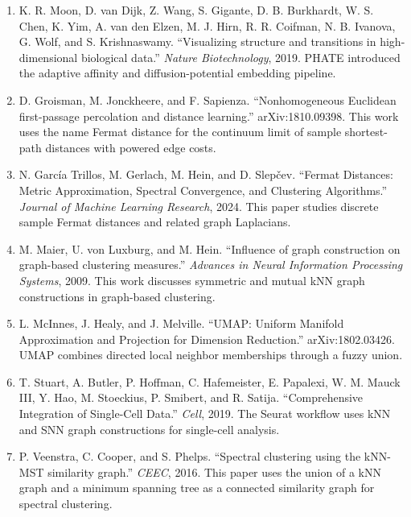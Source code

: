 \documentclass[11pt]{article}
\begin{document}
\begin{enumerate}[leftmargin=2em]
  \item K. R. Moon, D. van Dijk, Z. Wang, S. Gigante, D. B. Burkhardt, W. S. Chen,
  K. Yim, A. van den Elzen, M. J. Hirn, R. R. Coifman, N. B. Ivanova, G. Wolf,
  and S. Krishnaswamy. ``Visualizing structure and transitions in high-dimensional
  biological data.'' \emph{Nature Biotechnology}, 2019.  PHATE introduced the
  adaptive affinity and diffusion-potential embedding pipeline.
  \item D. Groisman, M. Jonckheere, and F. Sapienza. ``Nonhomogeneous Euclidean
  first-passage percolation and distance learning.'' arXiv:1810.09398.  This work
  uses the name Fermat distance for the continuum limit of sample shortest-path
  distances with powered edge costs.
  \item N. García Trillos, M. Gerlach, M. Hein, and D. Slepčev. ``Fermat Distances:
  Metric Approximation, Spectral Convergence, and Clustering Algorithms.''
  \emph{Journal of Machine Learning Research}, 2024.  This paper studies discrete
  sample Fermat distances and related graph Laplacians.
  \item M. Maier, U. von Luxburg, and M. Hein. ``Influence of graph construction on
  graph-based clustering measures.'' \emph{Advances in Neural Information Processing
  Systems}, 2009.  This work discusses symmetric and mutual kNN graph constructions
  in graph-based clustering.
  \item L. McInnes, J. Healy, and J. Melville. ``UMAP: Uniform Manifold Approximation
  and Projection for Dimension Reduction.'' arXiv:1802.03426.  UMAP combines directed
  local neighbor memberships through a fuzzy union.
  \item T. Stuart, A. Butler, P. Hoffman, C. Hafemeister, E. Papalexi, W. M. Mauck III,
  Y. Hao, M. Stoeckius, P. Smibert, and R. Satija. ``Comprehensive Integration of
  Single-Cell Data.'' \emph{Cell}, 2019.  The Seurat workflow uses kNN and SNN graph
  constructions for single-cell analysis.
  \item P. Veenstra, C. Cooper, and S. Phelps. ``Spectral clustering using the
  kNN-MST similarity graph.'' \emph{CEEC}, 2016.  This paper uses the union of a
  kNN graph and a minimum spanning tree as a connected similarity graph for spectral
  clustering.
\end{enumerate}
\end{document}
